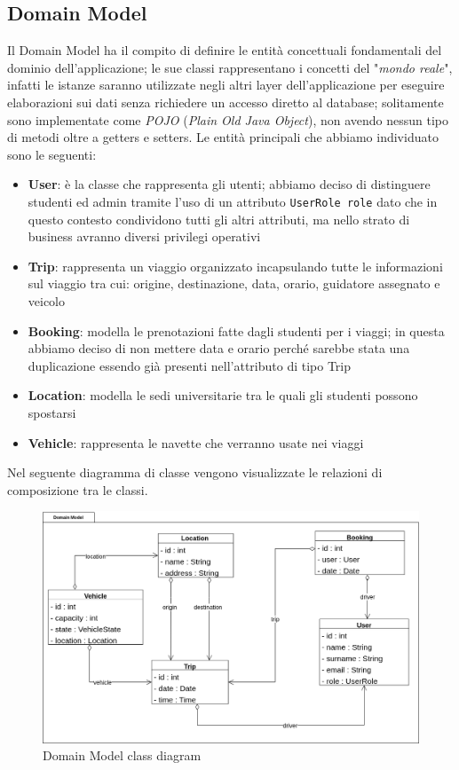 \subsection{Domain Model}\label{subsec:DM}
Il Domain Model ha il compito di definire le entità concettuali fondamentali del dominio dell'applicazione; le sue classi rappresentano i concetti del "\textit{mondo reale}", infatti le istanze saranno utilizzate negli altri layer dell'applicazione per eseguire elaborazioni sui dati senza richiedere un accesso diretto al database; solitamente sono implementate come \textit{POJO} (\textit{Plain Old Java Object}), non avendo nessun tipo di metodi oltre a getters e setters.
Le entità principali che abbiamo individuato sono le seguenti:
\begin{itemize}
    \item \textbf{User}: è la classe che rappresenta gli utenti; abbiamo deciso di distinguere studenti ed admin tramite l'uso di un attributo \texttt{UserRole role} dato che in questo contesto condividono  tutti gli altri attributi, ma nello strato di business avranno diversi privilegi operativi
    \item \textbf{Trip}: rappresenta un viaggio organizzato incapsulando tutte le informazioni sul viaggio tra cui: origine, destinazione, data, orario, guidatore assegnato e veicolo
    \item \textbf{Booking}: modella le prenotazioni fatte dagli studenti per i viaggi; in questa abbiamo deciso di non mettere data e orario perché sarebbe stata una duplicazione essendo già presenti nell'attributo di tipo Trip
    \item \textbf{Location}: modella le sedi universitarie tra le quali gli studenti possono spostarsi
    \item \textbf{Vehicle}: rappresenta le navette che verranno usate nei viaggi
\end{itemize}
Nel seguente diagramma di classe vengono visualizzate le relazioni di composizione tra le classi.
\begin{figure}[H]
    \centering
    \includegraphics[width=1.2\linewidth]{Images/DomainModel_diag.png}
    \caption{Domain Model class diagram}
    \label{fig:DMdiag}
\end{figure}
